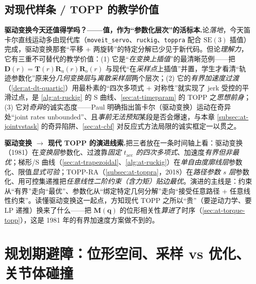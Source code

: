 \subsection{对现代样条 / TOPP 的教学价值}
\label{subsec:at-dt-modern}

\begin{insight}
\textbf{驱动变换今天还值得学吗？——值，作为“参数化层次”的活标本.}\;论\emph{落地}，今天笛卡尔直线运动多由现代库（\texttt{moveit\_servo}、\texttt{ruckig}、\texttt{toppra} 配合 $\mathrm{SE}(3)$ 插值）完成，驱动变换那套“平移 + 两旋转”的特定分解已少见于新代码。但论\emph{理解力}，它有三重不可替代的教学价值：(1) 它是“\emph{在变换上插值}”的最清晰范例——把 $\mathbf D(r)=\mathbf T(r)\mathbf R_a(r)\mathbf R_o(r)$ 与现代“在\emph{采样点}上插值”并置，学生才看清“轨迹参数化”原来分\emph{几何变换层}与\emph{离散采样层}两个层次；(2) 它的\emph{有界加速度过渡}（\cref{der:at-dt-quartic}）用最朴素的“四次多项式 + 对称性”就实现了 jerk 受控的平滑过点，是 \cref{alg:at-ruckig} 的 S 曲线、\cref{sec:at-timeparam} 的 TOPP 之\emph{思想前身}；(3) 它对\emph{奇异}的诚实态度——Paul 明确指出笛卡尔（驱动变换）运动在奇异处“joint rates unbounded”、且\emph{事前无法预知}某段是否会爆速\cite{paul1981robot}，与本章 \cref{subsec:at-jointvstask} 的奇异陷阱、\cref{sec:at-cbf} 对反应式方法局限的诚实框定一以贯之。
\end{insight}

\begin{note}
\textbf{驱动变换 $\to$ 现代 TOPP 的演进线索.}\;把三者放在一条时间轴上看：驱动变换（1981）在\emph{变换层}参数化、过渡靠\emph{固定 $t_{\mathrm{acc}}$ 的四次多项式}、加速度\emph{有界但非最优}；梯形/S 曲线（\cref{sec:at-trapezoidal}、\cref{alg:at-ruckig}）在\emph{单自由度廓线层}参数化、限值\emph{显式可验}；TOPP-RA（\cref{subsec:at-toppra}，2018）在\emph{路径参数 $s$ 层}参数化、用可控集递推把\emph{任意线性二阶约束（含力矩）贴边最优}。演进的主线是：约束从“有界”走向“最优”、参数化从“绑定特定几何分解”走向“接受任意路径 + 任意线性约束”。读懂驱动变换这一起点，方知现代 TOPP 之所以“贵”（要逆动力学、要 LP 递推）换来了什么——把 $\mathbf M(\mathbf q)$ 的位形相关性\emph{算进}了时序（\cref{sec:at-torque-topp}），这是 1981 年的有界加速度方案做不到的。
\end{note}

\section{规划期避障：位形空间、采样 vs 优化、关节体碰撞}
\label{sec:at-collision-global}

